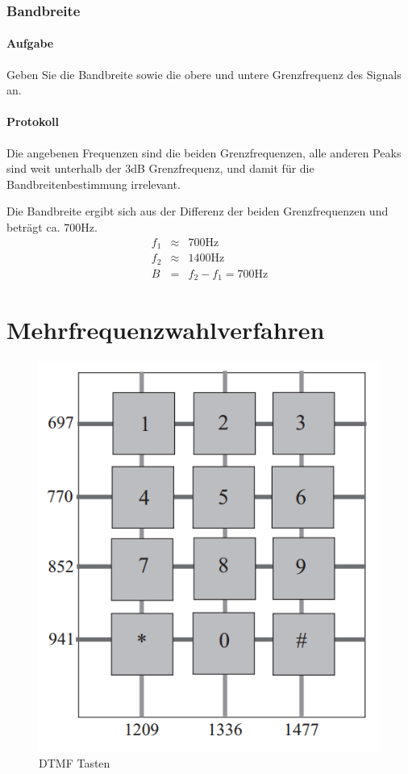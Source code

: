 \documentclass[10pt]{scrreprt}
\begin{document}
        \subsubsection{Bandbreite}
        \paragraph{Aufgabe}
        Geben Sie die Bandbreite sowie die obere und untere Grenzfrequenz des Signals an.
        \paragraph{Protokoll}
        Die angebenen Frequenzen sind die beiden Grenzfrequenzen, alle anderen
        Peaks sind weit unterhalb der $3$dB Grenzfrequenz, und damit für die
        Bandbreitenbestimmung irrelevant.

        Die Bandbreite ergibt sich aus der Differenz der beiden Grenzfrequenzen
        und beträgt ca. $700\si{\hertz}$.
        \begin{eqnarray*}
            f_1 &\approx& 700\si{\hertz}\\
            f_2 &\approx& 1400\si{\hertz}\\
            B &=& f_2 - f_1 = 700\si{\hertz}
        \end{eqnarray*}

        \section{Mehrfrequenzwahlverfahren}
        \begin{center}
            \begin{figure}[H]
                \includegraphics[width=\textwidth]{dtmf_pad.jpg}
                \caption{DTMF Tasten}
                \label{fig:DTFM_PAD}
            \end{figure}
        \end{center}
\end{document}

